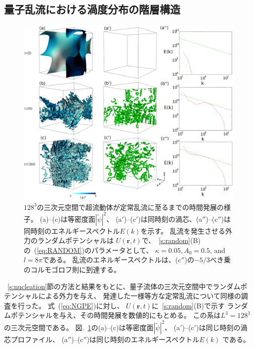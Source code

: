 \documentclass[12pt,a4paper]{jbook}
\begin{document}
		    \subsection{量子乱流における渦度分布の階層構造}
            \label{s:distributions}
			    \begin{figure}[H]
				    \centering
				\includegraphics[width=16cm]{fig14.eps}
				\caption{
                    $128^3$の三次元空間で超流動体が定常乱流に至るまでの時間発展の様子。
                    (a)--(c)は等密度面$|\tilde{\psi}|^2$、
                    (a$'$)--(c$'$)は同時刻の渦芯、(a$''$)--(c$''$)は同時刻のエネルギースペクトル$E(k)$を示す。
                    乱流を発生させる外力のランダムポテンシャルは
					$U(\bm{r}, t)$で、~\ref{s:random}(B)の~(\ref{eq:RANDOM})のパラメータとして、
					$\kappa=0.05, A_0=0.5$, and $l=8\pi $である。
                    乱流のエネルギースペクトルは、(c$''$)の$-5/3$べき乗のコルモゴロフ則に到達する。
				}
				\label{FIG:TURB}
			\end{figure}
			~\ref{s:nucleation}節の方法と結果をもとに、量子流体の三次元空間中でランダムポテンシャルによる外力を与え、
            発達した一様等方な定常乱流について同様の調査を行った。
			式~(\ref{eq:NGPE})に対し、
			$U(\bm{r},t)$に~\ref{s:random}(B)で示す
            ランダムポテンシャルを与え、その時間発展を数値的にもとめる。
			この系は$L^3=128^3$の三次元空間である。
			図.~\ref{FIG:TURB}の(a)--(c)は等密度面$|\tilde\psi|^2$、
            (a$'$)--(c$'$)は同じ時刻の渦芯プロファイル、
			(a$''$)--(c$''$)は同じ時刻のエネルギースペクトル$E(k)$
            である。
\end{document}
